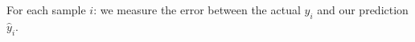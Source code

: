 \documentclass[preview]{standalone}
\begin{document}
\begin{center}
For each sample $i$: we measure the error between the actual $y_i$ and our prediction $\hat{y}_i$.
\end{center}
\end{document}
